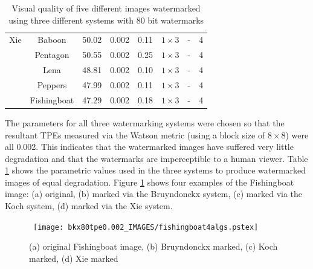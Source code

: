 \documentclass[12pt]{report}
\begin{document}
\begin{table}[htb]
\begin{center}
\begin{tabular}{|c|c|c|c|c|c|c|c|}
		Xie		 &Baboon          & 50.02        & 0.002 & 0.11           & $1 \times 3$   &-              &4\\ \cline{2-8}
                		&Pentagon        & 50.55        & 0.002 & 0.25           & $1 \times 3$   &-              &4\\ \cline{2-8}
                		&Lena            & 48.81        & 0.002 & 0.10           & $1 \times 3$   &-              &4\\ \cline{2-8}
                		&Peppers         & 47.99        & 0.002 & 0.11           & $1 \times 3$   &-              &4\\ \cline{2-8}
                		&Fishingboat     & 47.29        & 0.002 & 0.18           & $1 \times 3$   &-              &4\\ \hline
                \end{tabular}
		\caption{Visual quality of five different images watermarked using three different systems with 80 bit watermarks}
                \label{bkxVQBKX}
        \end{center}
\end{table}
\normalsize
The parameters for all three watermarking systems were chosen so that the resultant TPEs measured via the
Watson metric (using a block size of $8 \times 8$) were all 0.002. This indicates that the watermarked images
have suffered very little degradation and that the watermarks are imperceptible to a human viewer.
Table \ref{bkxVQBKX} shows the parametric values used in the three systems to produce watermarked images of equal
degradation.
Figure \ref{fig:4fishBKX} shows four examples of the Fishingboat image: (a) original, (b) marked via the Bruyndonckx system, 
(c) marked via the Koch system, (d) marked via the Xie system. 

\begin{figure}[p]
	\centerline{ \hbox{
	\texttt{[image: bkx80tpe0.002\_IMAGES/fishingboat4algs.pstex]}
	}}
	\caption{(a) original Fishingboat image, (b) Bruyndonckx marked, (c) Koch marked, (d) Xie marked}
	\label{fig:4fishBKX}
\end{figure}
\end{document}
